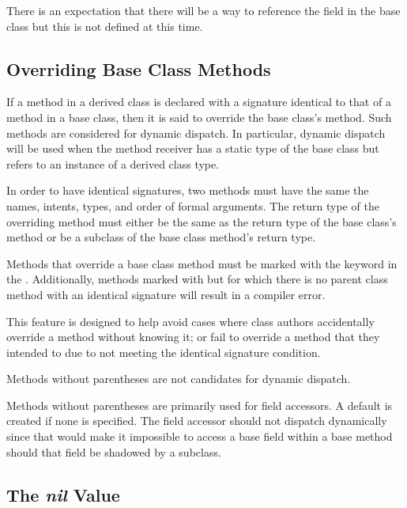 \begin{openissue}
There is an expectation that there will
be a way to reference the field in the base class but this is not
defined at this time.
\end{openissue}

\subsection{Overriding Base Class Methods}
\label{Overriding_Base_Class_Methods}

If a method in a derived class is declared with a signature identical to
that of a method in a base class, then it is said to override the base
class's method. Such methods are considered for dynamic dispatch.  In
particular, dynamic dispatch will be used when the method receiver has a
static type of the base class but refers to an instance of a derived
class type.

In order to have identical signatures, two methods must have the same the
names, intents, types, and order of formal arguments. The return type of
the overriding method must either be the same as the return type of the base
class's method or be a subclass of the base class method's return
type.

Methods that override a base class method must be marked with the
 keyword in the . Additionally,
methods marked with  but for which there is no parent class
method with an identical signature will result in a compiler error.

\begin{rationale}
  This feature is designed to help avoid cases where class authors
  accidentally override a method without knowing it; or fail to override
  a method that they intended to due to not meeting the identical
  signature condition.
\end{rationale}


Methods without parentheses are not candidates for dynamic dispatch.
\begin{rationale}
Methods without parentheses are primarily used for field accessors.
A default is created if none is specified.  The field accessor
should not dispatch dynamically since that would make it
impossible to access a base field within a base method should that
field be shadowed by a subclass.
\end{rationale}

\subsection{The {\em nil} Value}
\label{Class_nil_value}

